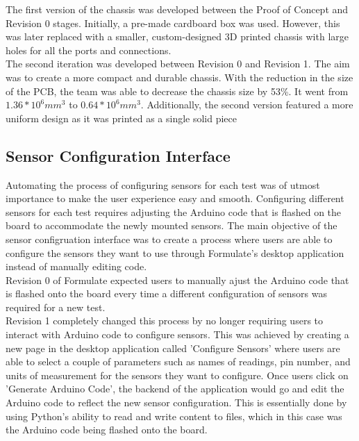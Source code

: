 \documentclass[12pt,titlepage]{article}
\begin{document}
The first version of the chassis was developed between the Proof of Concept and Revision 0 stages. Initially, a pre-made cardboard box was used. However, this was later replaced with a smaller, custom-designed 3D printed chassis with large holes for all the ports and connections.\\

The second iteration was developed between Revision 0 and Revision 1. The aim was to create a more compact and durable chassis. With the reduction in the size of the PCB, the team was able to decrease the chassis size by 53\%. It went from $1.36*10^6 mm^3$ to $0.64*10^6mm^3$. Additionally, the second version featured a more uniform design as it was printed as a single solid piece
\subsection{Sensor Configuration Interface}
Automating the process of configuring sensors for each test was of utmost importance to make the user experience easy and smooth. Configuring different sensors
for each test requires adjusting the Arduino code that is flashed on the board to accommodate the newly mounted sensors. The main
objective of the sensor configruation interface was to create a process where users are able to configure the sensors they want to use through
Formulate's desktop application instead of manually editing code. \\

Revision 0 of Formulate expected users to manually ajust the Arduino code that is flashed onto the board every time a different configuration
of sensors was required for a new test. \\

Revision 1 completely changed this process by no longer requiring users to interact with Arduino code to configure sensors. This was achieved by creating a new
page in the desktop application called 'Configure Sensors' where users are able to select a couple of parameters such as names of readings, pin number, and units of
measurement for the sensors they want to configure. Once users click on 'Generate Arduino Code', the backend of the application would go and edit the Arduino
code to reflect the new sensor configuration. This is essentially done by using Python's ability to read and write content to files, which in this case was the
Arduino code being flashed onto the board.
\end{document}

